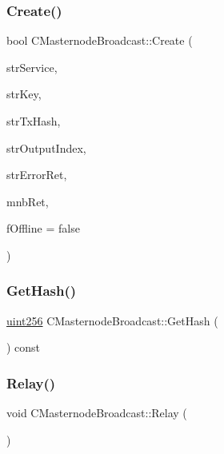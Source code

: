 \subsubsection{\texorpdfstring{Create()}{Create()}\hspace{0.1cm}{\footnotesize\ttfamily [2/2]}}
{\footnotesize\ttfamily bool C\+Masternode\+Broadcast\+::\+Create (\begin{DoxyParamCaption}\item[{std\+::string}]{str\+Service,  }\item[{std\+::string}]{str\+Key,  }\item[{std\+::string}]{str\+Tx\+Hash,  }\item[{std\+::string}]{str\+Output\+Index,  }\item[{std\+::string \&}]{str\+Error\+Ret,  }\item[{\mbox{\hyperlink{class_c_masternode_broadcast}{C\+Masternode\+Broadcast}} \&}]{mnb\+Ret,  }\item[{bool}]{f\+Offline = {\ttfamily false} }\end{DoxyParamCaption})\hspace{0.3cm}{\ttfamily [static]}}

\mbox{\label{class_c_masternode_broadcast_a402adbbedd893b31ae21eeb436f2afb1}} 
\subsubsection{\texorpdfstring{Get\+Hash()}{GetHash()}}
{\footnotesize\ttfamily \mbox{\hyperlink{classuint256}{uint256}} C\+Masternode\+Broadcast\+::\+Get\+Hash (\begin{DoxyParamCaption}{ }\end{DoxyParamCaption}) const\hspace{0.3cm}{\ttfamily [inline]}}

\mbox{\label{class_c_masternode_broadcast_a54fc9e822e1524bee8852a0bf6d82736}} 
\subsubsection{\texorpdfstring{Relay()}{Relay()}}
{\footnotesize\ttfamily void C\+Masternode\+Broadcast\+::\+Relay (\begin{DoxyParamCaption}{ }\end{DoxyParamCaption})}

